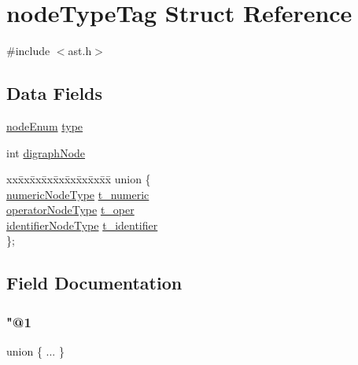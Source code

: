 \hypertarget{structnode_type_tag}{}\section{node\+Type\+Tag Struct Reference}
\label{structnode_type_tag}


{\ttfamily \#include $<$ast.\+h$>$}

\subsection*{Data Fields}
\begin{DoxyCompactItemize}
\item 
\hyperlink{ast_8h_a14ca0b0420e32b2a603589b79d680a9e}{node\+Enum} \hyperlink{structnode_type_tag_ab60be6a5113c8fd8928ef6bf82580818}{type}
\item 
int \hyperlink{structnode_type_tag_a6b7a1b1e36c87652f87e4f6213d58359}{digraph\+Node}
\item 
\begin{tabbing}
xx\=xx\=xx\=xx\=xx\=xx\=xx\=xx\=xx\=\kill
union \{\\
\>\hyperlink{structnumeric_node_type}{numericNodeType} \hyperlink{structnode_type_tag_afc977737cf4a23085551f9fa013a4691}{t\_numeric}\\
\>\hyperlink{structoperator_node_type}{operatorNodeType} \hyperlink{structnode_type_tag_ac7bb317a3d1980651b962f891f162462}{t\_oper}\\
\>\hyperlink{structidentifier_node_type}{identifierNodeType} \hyperlink{structnode_type_tag_a02bb0284bffb88e6a4cee581a891e540}{t\_identifier}\\
\}; \\

\end{tabbing}\end{DoxyCompactItemize}


\subsection{Field Documentation}
\mbox{\label{structnode_type_tag_a7a101db6bef3d0f16cb35bc1e6377b2f}} 
\subsubsection{\texorpdfstring{"@1}{@1}}
{\footnotesize\ttfamily union \{ ... \} }

\mbox{\label{structnode_type_tag_a6b7a1b1e36c87652f87e4f6213d58359}} 
